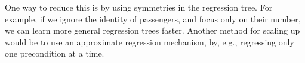 \documentclass[letterpaper]{article}
\theoremstyle{definition}
\begin{document}
One way to reduce this is by using symmetries in the regression tree. For example, if we ignore the identity of passengers, and focus only on their number, we can learn more general regression trees faster. Another method for scaling up would be to use an approximate regression mechanism, by, e.g., regressing only one precondition at a time. 








\end{document}

